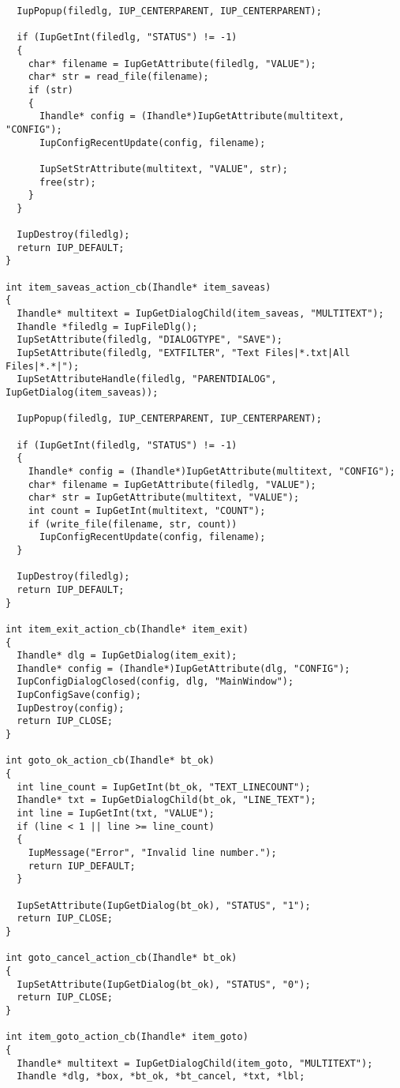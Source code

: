 \documentclass{ctexart}
\begin{document}
\begin{lstlisting}
  IupPopup(filedlg, IUP_CENTERPARENT, IUP_CENTERPARENT);

  if (IupGetInt(filedlg, "STATUS") != -1)
  {
    char* filename = IupGetAttribute(filedlg, "VALUE");
    char* str = read_file(filename);
    if (str)
    {
      Ihandle* config = (Ihandle*)IupGetAttribute(multitext, "CONFIG");
      IupConfigRecentUpdate(config, filename);

      IupSetStrAttribute(multitext, "VALUE", str);
      free(str);
    }
  }

  IupDestroy(filedlg);
  return IUP_DEFAULT;
}

int item_saveas_action_cb(Ihandle* item_saveas)
{
  Ihandle* multitext = IupGetDialogChild(item_saveas, "MULTITEXT");
  Ihandle *filedlg = IupFileDlg();
  IupSetAttribute(filedlg, "DIALOGTYPE", "SAVE");
  IupSetAttribute(filedlg, "EXTFILTER", "Text Files|*.txt|All Files|*.*|");
  IupSetAttributeHandle(filedlg, "PARENTDIALOG", IupGetDialog(item_saveas));

  IupPopup(filedlg, IUP_CENTERPARENT, IUP_CENTERPARENT);

  if (IupGetInt(filedlg, "STATUS") != -1)
  {
    Ihandle* config = (Ihandle*)IupGetAttribute(multitext, "CONFIG");
    char* filename = IupGetAttribute(filedlg, "VALUE");
    char* str = IupGetAttribute(multitext, "VALUE");
    int count = IupGetInt(multitext, "COUNT");
    if (write_file(filename, str, count))
      IupConfigRecentUpdate(config, filename);
  }

  IupDestroy(filedlg);
  return IUP_DEFAULT;
}

int item_exit_action_cb(Ihandle* item_exit)
{
  Ihandle* dlg = IupGetDialog(item_exit);
  Ihandle* config = (Ihandle*)IupGetAttribute(dlg, "CONFIG");
  IupConfigDialogClosed(config, dlg, "MainWindow");
  IupConfigSave(config);
  IupDestroy(config);
  return IUP_CLOSE;
}

int goto_ok_action_cb(Ihandle* bt_ok)
{
  int line_count = IupGetInt(bt_ok, "TEXT_LINECOUNT");
  Ihandle* txt = IupGetDialogChild(bt_ok, "LINE_TEXT");
  int line = IupGetInt(txt, "VALUE");
  if (line < 1 || line >= line_count)
  {
    IupMessage("Error", "Invalid line number.");
    return IUP_DEFAULT;
  }

  IupSetAttribute(IupGetDialog(bt_ok), "STATUS", "1");
  return IUP_CLOSE;
}

int goto_cancel_action_cb(Ihandle* bt_ok)
{
  IupSetAttribute(IupGetDialog(bt_ok), "STATUS", "0");
  return IUP_CLOSE;
}

int item_goto_action_cb(Ihandle* item_goto)
{
  Ihandle* multitext = IupGetDialogChild(item_goto, "MULTITEXT");
  Ihandle *dlg, *box, *bt_ok, *bt_cancel, *txt, *lbl;


\end{lstlisting}
\end{document}
